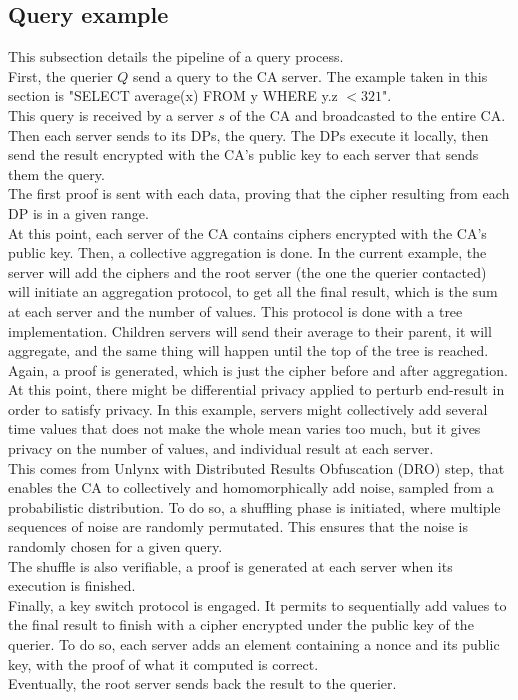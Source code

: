 \documentclass{article}
\begin{document}
\subsection{Query example}
This subsection details the pipeline of a query process.\\
First, the querier $Q$ send a query to the CA server. The example taken in this section is "SELECT average(x) FROM y WHERE y.z $< 321$".\\
This query is received by a server $s$ of the CA and broadcasted to the entire CA. Then each server sends to its DPs, the query. The DPs execute it locally, then send the result encrypted with the CA's public key to each server that sends them the query.\\
The first proof is sent with each data, proving that the cipher resulting from each DP is in a given range.\\
At this point, each server of the CA contains ciphers encrypted with the CA's public key.
Then, a collective aggregation is done. In the current example, the server will add the ciphers and the root server (the one the querier contacted) will initiate an aggregation protocol, to get all the final result, which is the sum at each server and the number of values. This protocol is done with a tree implementation. Children servers will send their average to their parent, it will aggregate, and the same thing will happen until the top of the tree is reached.\\
Again, a proof is generated, which is just the cipher before and after aggregation.\\
At this point, there might be differential privacy applied to perturb end-result in order to satisfy privacy. In this example, servers might collectively add several time values that does not make the whole mean varies too much, but it gives privacy on the number of values, and individual result at each server.\\
This comes from Unlynx with Distributed Results Obfuscation (DRO) step, that enables the CA to collectively and homomorphically add noise, sampled from a probabilistic distribution.
To do so, a shuffling phase is initiated, where multiple sequences of noise are randomly permutated. This ensures that the noise is randomly chosen for a given query.\\
The shuffle is also verifiable, a proof is generated at each server when its execution is finished.\\
Finally, a key switch protocol is engaged. It permits to sequentially add values to the final result to finish with a cipher encrypted under the public key of the querier. To do so, each server adds an element containing a nonce and its public key, with the proof of what it computed is correct.\\
Eventually, the root server sends back the result to the querier.\\
\end{document}

